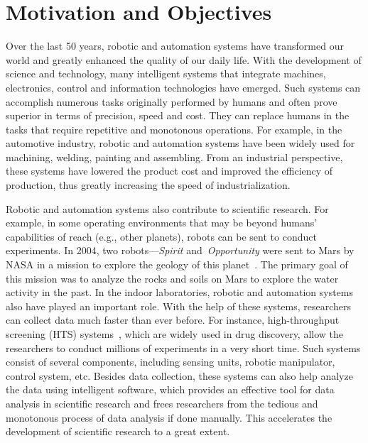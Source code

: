 \section{Motivation and Objectives}

Over the last 50 years, robotic and automation systems have transformed our world and greatly enhanced the quality of our daily life. With the development of science and technology, many intelligent systems that integrate machines, electronics, control and information technologies have emerged. Such systems can accomplish numerous tasks originally performed by humans and often prove superior in terms of precision, speed and cost. They can replace humans in the tasks that require repetitive and monotonous operations. For example, in the automotive industry, robotic and automation systems have been widely used for machining, welding, painting and assembling. From an industrial perspective, these systems have lowered the product cost and improved the efficiency of production, thus greatly increasing the speed of industrialization. 

Robotic and automation systems also contribute to scientific research. For example, in some operating environments that may be beyond humans' capabilities of reach (e.g., other planets), robots can be sent to conduct experiments. In 2004, two robots---\textit{Spirit} and~\textit{Opportunity} were sent to Mars by NASA in a mission to explore the geology of this planet~\cite{Grotzinger:Sci:2014}. The primary goal of this mission was to analyze the rocks and soils on Mars to explore the water activity in the past. In the indoor laboratories, robotic and automation systems also have played an important role. With the help of these systems, researchers can collect data much faster than ever before. For instance, high-throughput screening (HTS) systems~\cite{Hertzberg2000}, which are widely used in drug discovery, allow the researchers to conduct millions of experiments in a very short time. Such systems consist of several components, including sensing units, robotic manipulator, control system, etc. Besides data collection, these systems can also help analyze the data using intelligent software, which provides an effective tool for data analysis in scientific research and frees researchers from the tedious and monotonous process of data analysis if done manually. This accelerates the development of scientific research to a great extent. 

